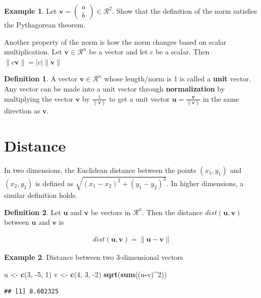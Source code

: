 \documentclass[
]{book}
\newenvironment{Shaded}{\begin{snugshade}}{\end{snugshade}}
\newcommand{\DecValTok}[1]{\textcolor[rgb]{0.00,0.00,0.81}{#1}}
\newcommand{\KeywordTok}[1]{\textcolor[rgb]{0.13,0.29,0.53}{\textbf{#1}}}
\newcommand{\NormalTok}[1]{#1}
\newcommand{\OperatorTok}[1]{\textcolor[rgb]{0.81,0.36,0.00}{\textbf{#1}}}
\newcommand{\StringTok}[1]{\textcolor[rgb]{0.31,0.60,0.02}{#1}}
\theoremstyle{definition}
\newtheorem{definition}{Definition}[chapter]
\theoremstyle{definition}
\newtheorem{example}{Example}[chapter]
\theoremstyle{definition}
\theoremstyle{definition}
\theoremstyle{remark}
\begin{document}
\begin{example}
Let \(\mathbf{v} = \begin{pmatrix} a \\ b \end{pmatrix} \in \mathcal{R}^2\). Show that the definition of the norm satisfies the Pythagorean theorem.
\end{example}

Another property of the norm is how the norm changes based on scalar multiplication. Let \(\mathbf{v} \in \mathcal{R}^n\) be a vector and let \(c\) be a scalar. Then \(\|c \mathbf{v}\| = |c|\|\mathbf{v}\|\)

\begin{definition}
A vector \(\mathbf{v} \in \mathcal{R}^n\) whose length/norm is 1 is called a \textbf{unit} vector. Any vector can be made into a unit vector through \textbf{normalization} by multiplying the vector \(\mathbf{v}\) by \(\frac{1}{\|\mathbf{v}\|}\) to get a unit vector \(\mathbf{u} = \frac{\mathbf{v}}{\|\mathbf{v}\|}\) in the same direction as \(\mathbf{v}\).
\end{definition}

\hypertarget{distance}{%
\section{Distance}\label{distance}}

In two dimensions, the Euclidean distance between the points \((x_1, y_1)\) and \((x_2, y_2)\) is defined as \(\sqrt{(x_1 - x_2)^2 + (y_1 - y_2)^2}\). In higher dimensions, a similar definition holds.

\begin{definition}
Let \(\mathbf{u}\) and \(\mathbf{v}\) be vectors in \(\mathcal{R}^n\). Then the distance \(dist(\mathbf{u}, \mathbf{v})\) between \(\mathbf{u}\) and \(\mathbf{v}\) is

\[
\begin{aligned}
dist(\mathbf{u}, \mathbf{v}) = \|\mathbf{u} - \mathbf{v}\|
\end{aligned}
\]
\end{definition}

\begin{example}

Distance between two 3-dimensional vectors

\begin{Shaded}
\begin{Highlighting}[]
\NormalTok{u <-}\StringTok{ }\KeywordTok{c}\NormalTok{(}\DecValTok{3}\NormalTok{, }\DecValTok{-5}\NormalTok{, }\DecValTok{1}\NormalTok{)}
\NormalTok{v <-}\StringTok{ }\KeywordTok{c}\NormalTok{(}\DecValTok{4}\NormalTok{, }\DecValTok{3}\NormalTok{, }\DecValTok{-2}\NormalTok{)}
\KeywordTok{sqrt}\NormalTok{(}\KeywordTok{sum}\NormalTok{((u}\OperatorTok{-}\NormalTok{v)}\OperatorTok{^}\DecValTok{2}\NormalTok{))}
\end{Highlighting}
\end{Shaded}

\begin{verbatim}
## [1] 8.602325
\end{verbatim}

\end{example}
\end{document}

